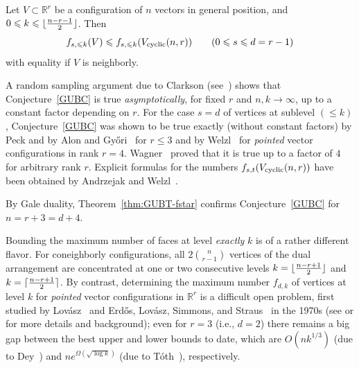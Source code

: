 \documentclass[a4paper,USenglish,cleveref, autoref, thm-restate,nolineno]{socg-lipics-v2021}
\renewcommand{\leq}{\leqslant}
\newcommand{\R}{\mathbb{R}}
\DeclarePairedDelimiter\ceil{\lceil}{\rceil}
\DeclarePairedDelimiter\floor{\lfloor}{\rfloor}
\newcommand{\cyclic}{V_{\textup{cyclic}}}
\begin{document}
\begin{conjecture}
\label{GUBC} 
Let $V \subset \R^r$ be a configuration of $n$ vectors in general position, and $0\leq k\leq \floor{\frac{n-r-1}{2}}$. Then 
\[f_{s,\leq k}(V) \leq f_{s,\leq k}(\cyclic(n,r)) \qquad (0 \leq s \leq d=r-1)\]
with equality if $V$ is neighborly.
\end{conjecture}
A random sampling argument due to Clarkson (see~\cite{Clarkson:1989aa}) shows that Conjecture~\ref{GUBC} is true \emph{asymptotically}, for fixed $r$ and $n,k\to \infty$, up to a constant factor depending on $r$. For the case $s=d$ of vertices at sublevel $(\leq k)$, Conjecture~\ref{GUBC} was shown to be true exactly (without constant factors) by Peck \cite{Peck:1985aa} and by Alon and Gy\H{o}ri~\cite{Alon:1986aa} for $r\leq 3$ and by Welzl~\cite{Welzl:2001aa} for \emph{pointed} vector configurations in rank $r=4$.  Wagner~\cite{Wagner:2006aa} proved that it is true up to a factor of $4$ for arbitrary rank $r$. Explicit formulas for the numbers $f_{s,t}(\cyclic(n,r))$ %
have been obtained by Andrzejak and Welzl~\cite{Andrzejak:2003aa}. 

By Gale duality, Theorem~\ref{thm:GUBT-fstar} confirms Conjecture~\ref{GUBC} for $n=r+3=d+4$. 

\begin{remark} Bounding the maximum number of faces at level \emph{exactly} $k$ is of a rather different flavor. For coneighborly configurations, all $2\binom{n}{r-1}$ vertices of the dual arrangement are concentrated at one or two consecutive levels $k=\floor{\frac{n-r+1}{2}}$ and $k=\ceil{\frac{n-r+1}{2}}$. By contrast, determining the maximum number $f_{d,k}$ of vertices at level $k$ for \emph{pointed} vector configurations in $\R^r$ is a difficult open problem, first studied by Lov\'asz~\cite{Lovasz:1971aa} and Erd\H{o}s, Lov\'asz, Simmons, and Straus~\cite{Erdos:1973aa} in the 1970s (see \cite{Wagner:2008aa} or \cite[Ch.~11]{Matousek:2002aa} for more details and background); even for $r=3$ (i.e., $d=2$) there remains a big gap between the best upper and lower bounds to date, which are $O(nk^{1/3})$ (due to Dey~\cite{Dey:1998aa}) and $ne^{\Omega(\sqrt{\log k})}$ (due to T\'oth~\cite{Toth:2001aa}), respectively.
\end{remark}
\end{document}
